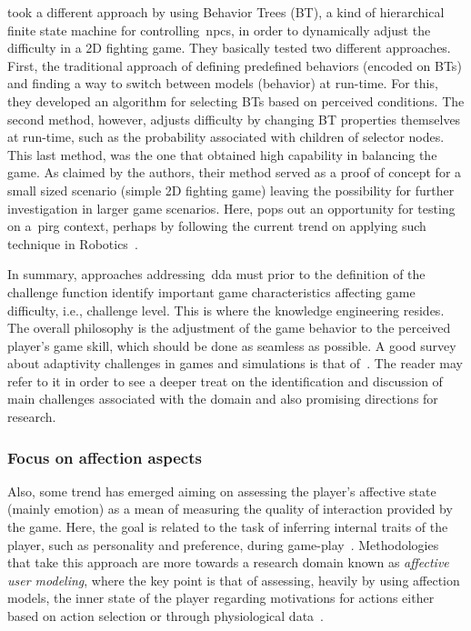 \cite{sejrsgaard-jacobsen_dynamic_2011} took a different approach by using Behavior Trees (BT), a kind of hierarchical finite state machine for controlling~\gls{npc}s, in order to dynamically adjust the difficulty in a 2D fighting game. They basically tested two different approaches. First, the traditional approach of defining predefined behaviors (encoded on BTs) and finding a way to switch between models (behavior) at run-time. For this, they developed an algorithm for selecting BTs based on perceived conditions. The second method, however, adjusts difficulty by changing BT properties themselves at run-time, such as the probability associated with children of selector nodes. This last method, was the one that obtained high capability in balancing the game. As claimed by the authors, their method served as a proof of concept for a small sized scenario (simple 2D fighting game) leaving the possibility for further investigation in larger game scenarios. Here, pops out an opportunity for testing on a~\gls{pirg} context, perhaps by following the current trend on applying such technique in Robotics~\citep{scheper_behavior_2015, pereira_framework_2015, marzinotto_towards_2014}.

In summary, approaches addressing~\gls{dda} must prior to the definition of the challenge function identify important game characteristics affecting game difficulty, i.e., challenge level. This is where the knowledge engineering resides. The overall philosophy is the adjustment of the game behavior to the perceived player's game skill, which should be done as seamless as possible. A good survey about adaptivity challenges in games and simulations is that of~\cite{lopes_adaptivity_2011}. The reader may refer to it in order to see a deeper treat on the identification and discussion of main challenges associated with the domain and also promising directions for research.

\subsubsection{Focus on affection aspects}\label{affectmodeling}
Also, some trend has emerged aiming on assessing the player's affective state (mainly emotion) as a mean of measuring the quality of interaction provided by the game. Here, the goal is related to the task of inferring internal traits of the player, such as personality and preference, during game-play~\citep{van_lankveld_psychologically_2009}. Methodologies that take this approach are more towards a research domain known as \textit{affective user modeling}, where the key point is that of assessing, heavily by using affection models, the inner state of the player regarding motivations for actions either based on action selection or through physiological data~\citep{van_lankveld_psychologically_2009}.

